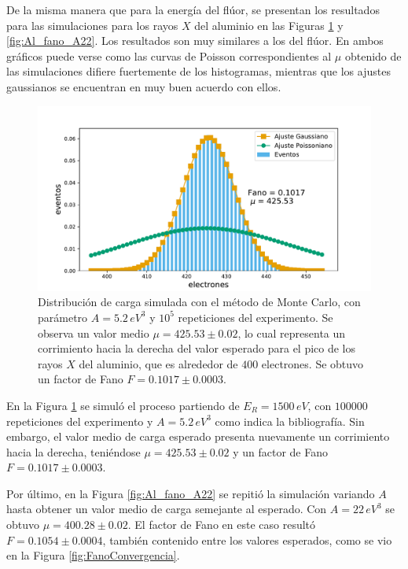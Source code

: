 De la misma manera que para la energía del flúor, se presentan los resultados para las simulaciones para los rayos $X$ del aluminio en las Figuras \ref{fig:Al_fano_A5.2} y \ref{fig:Al_fano_A22}. Los resultados son muy similares a los del flúor. En ambos gráficos puede verse como las curvas de Poisson correspondientes al $\mu$ obtenido de las simulaciones difiere fuertemente de los histogramas, mientras que los ajustes gaussianos se encuentran en muy buen acuerdo con ellos. 
\begin{figure}[h]
    \centering
    \includegraphics[scale=0.5]{Figs/Al_Fano_1500_A5.2_Eloss0_100ktrials.pdf}
    \caption{Distribución de carga simulada con el método de Monte Carlo, con parámetro $A = 5.2\,\si{eV}^{3}$ y $10^{5}$ repeticiones del experimento. Se observa un valor medio $\mu = 425.53 \pm 0.02$, lo cual representa un corrimiento hacia la derecha del valor esperado para el pico de los rayos $X$ del aluminio, que es alrededor de $400$ electrones. Se obtuvo un factor de Fano $F = 0.1017 \pm 0.0003$.}
    \label{fig:Al_fano_A5.2}
\end{figure}

En la Figura \ref{fig:Al_fano_A5.2} se simuló el proceso partiendo de $E_{R} = 1500\,\si{eV}$, con $100000$ repeticiones del experimento y $A = 5.2\,\si{eV}^{3}$ como indica la bibliografía. Sin embargo, el valor medio de carga esperado presenta nuevamente un corrimiento hacia la derecha, teniéndose $\mu = 425.53 \pm 0.02$ y un factor de Fano $F = 0.1017 \pm 0.0003$.

Por último, en la Figura \ref{fig:Al_fano_A22} se repitió la simulación variando $A$ hasta obtener un valor medio de carga semejante al esperado. Con $A = 22\,\si{eV}^{3}$ se obtuvo $\mu = 400.28 \pm 0.02$. El factor de Fano en este caso resultó $F = 0.1054 \pm 0.0004$, también contenido entre los valores esperados, como se vio en la Figura \ref{fig:FanoConvergencia}.


